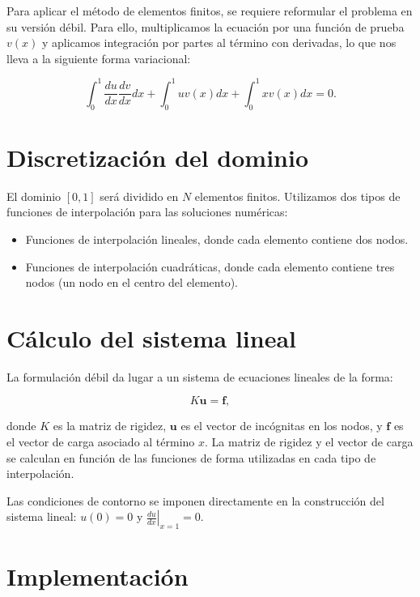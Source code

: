 Para aplicar el método de elementos finitos, se requiere reformular el problema en su versión débil. Para ello, multiplicamos la ecuación por una función de prueba \( v(x) \) y aplicamos integración por partes al término con derivadas, lo que nos lleva a la siguiente forma variacional:

\begin{equation}
\int_0^1 \frac{du}{dx} \frac{dv}{dx} dx + \int_0^1 u v(x) dx + \int_0^1 x v(x) dx = 0.
\end{equation}

\section{Discretización del dominio}

El dominio \( [0,1] \) será dividido en \( N \) elementos finitos. Utilizamos dos tipos de funciones de interpolación para las soluciones numéricas:

\begin{itemize}
    \item Funciones de interpolación lineales, donde cada elemento contiene dos nodos.
    \item Funciones de interpolación cuadráticas, donde cada elemento contiene tres nodos (un nodo en el centro del elemento).
\end{itemize}

\section{Cálculo del sistema lineal}

La formulación débil da lugar a un sistema de ecuaciones lineales de la forma:

\begin{equation}
K \mathbf{u} = \mathbf{f},
\end{equation}

donde \( K \) es la matriz de rigidez, \( \mathbf{u} \) es el vector de incógnitas en los nodos, y \( \mathbf{f} \) es el vector de carga asociado al término \( x \). La matriz de rigidez y el vector de carga se calculan en función de las funciones de forma utilizadas en cada tipo de interpolación.

Las condiciones de contorno se imponen directamente en la construcción del sistema lineal: \( u(0) = 0 \) y \( \left. \frac{du}{dx} \right|_{x=1} = 0 \).

\section{Implementación}

